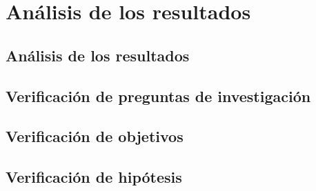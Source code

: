 \chapter{Análisis de los resultados}

\section{Análisis de los resultados}

\section{Verificación de preguntas de investigación}

\section{Verificación de objetivos}

\section{Verificación de hipótesis}

\newpage